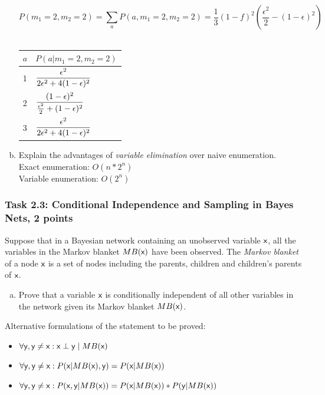 \documentclass[12pt,a4paper,oneside]{article}
\begin{document}
\begin{enumerate}[a)]
\[ P(m_1=2,m_2=2) = \sum_aP(a,m_1=2,m_2=2) = \frac{1}{3}(1-f)^2(\frac{\epsilon^2}{2} - (1-\epsilon)^2) \]
\\
\begin{tabular}{l|l}
$a$ & $P(a|m_1=2,m_2=2)$ \\ \hline
1	& $\mathlarger{\frac{\epsilon^2}{2\epsilon^2+4(1-\epsilon)^2}}$ \\ \hline
2	& $\mathlarger{\frac{(1-\epsilon)^2}{\frac{\epsilon^2}{2}+(1-\epsilon)^2}}$ \\ \hline
3	& $\mathlarger{\frac{\epsilon^2}{2\epsilon^2+4(1-\epsilon)^2}}$ \\ \hline

\end{tabular}

  
\item Explain the advantages of \emph{variable elimination} over naive
  enumeration.\\
  Exact enumeration: $O(n*2^n)$\\
  Variable enumeration: $O(2^n)$
\end{enumerate}


%
%
\subsubsection*{Task 2.3: Conditional Independence and Sampling in Bayes Nets, 2 points}
Suppose that in a Bayesian network containing an unobserved variable $\rv{x}$,
all the variables in the Markov blanket $MB(\rv{x})$ have been observed.
%
The \emph{Markov blanket} of a node $\rv{x}$ is a set of nodes including the
parents, children and children's parents of $\rv{x}$.

\begin{enumerate}[a)]
\item Prove that a variable $\rv{x}$ is conditionally independent of all other
  variables in the network given its Markov blanket $MB(\rv{x})$.
\end{enumerate}

\noindent
Alternative formulations of the statement to be proved:
\begin{itemize}
\item $\forall \rv{y}, \rv{y} \neq \rv{x}: \rv{x} \perp \rv{y} \; | \; MB(\rv{x})$
\item $\forall \rv{y}, \rv{y} \neq \rv{x}: P(\rv{x}|MB(\rv{x}),\rv{y}) = P(\rv{x}|MB(\rv{x}))$
\item $\forall \rv{y}, \rv{y} \neq \rv{x}: P(\rv{x},\rv{y}|MB(\rv{x})) = P(\rv{x}|MB(\rv{x}))*P(\rv{y}|MB(\rv{x}))$
\end{itemize}
\end{document}
